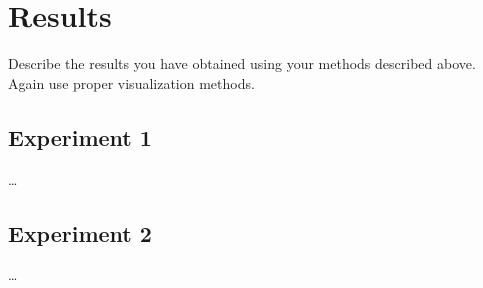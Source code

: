 \section{Results}
\label{sec:results}

Describe the results you have obtained using your methods described above. Again use proper visualization methods.

\subsection{Experiment 1}

\dots

\subsection{Experiment 2}

\dots